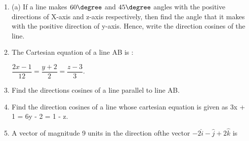 \begin{enumerate}
\item (a) If a line makes $60\degree$  and $45\degree$ angles with the positive directions of X-axis and z-axis respectively, then find the angle that it makes with the positive direction of y-axis. Hence, write the direction cosines of the line.
\item The Cartesian equation of a line AB is :       
\begin{center}
$\dfrac{2x-1}{12} = \dfrac{ y+2}{2} = \dfrac{z-3}{3}$.\\
\end{center}                                      
\item Find the directions cosines of a line parallel to line AB.
\item Find the direction cosines of a line whose cartesian equation is given as 3x + 1 = 6y - 2 = 1 - z.
\item A vector of magnitude 9 units in the direction ofthe vector $-2\hat{i} - \hat{j} + 2\hat{k}$ is \underline{\hspace{1cm}}    
\end{enumerate}

